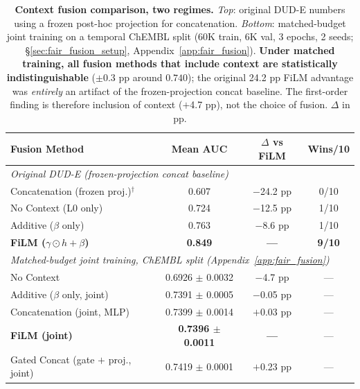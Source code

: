 \documentclass[sigconf]{acmart}
\begin{document}
\begin{table}[t]
\caption{\textbf{Context fusion comparison, two regimes.} \textit{Top}: original DUD-E numbers using a frozen post-hoc projection for concatenation. \textit{Bottom}: matched-budget joint training on a temporal ChEMBL split (60K train, 6K val, 3 epochs, 2 seeds; \S\ref{sec:fair_fusion_setup}, Appendix~\ref{app:fair_fusion}). \textbf{Under matched training, all fusion methods that include context are statistically indistinguishable} ($\pm 0.3$ pp around $0.740$); the original 24.2 pp FiLM advantage was \emph{entirely} an artifact of the frozen-projection concat baseline. The first-order finding is therefore inclusion of context ($+$4.7 pp), not the choice of fusion. $\Delta$ in pp.}
\label{tab:fusion}
\centering
\small
\begin{tabular}{@{}lccc@{}}
\toprule
\textbf{Fusion Method} & \textbf{Mean AUC} & \textbf{$\Delta$ vs FiLM} & \textbf{Wins/10} \\
\midrule
\multicolumn{4}{l}{\textit{Original DUD-E (frozen-projection concat baseline)}} \\
Concatenation (frozen proj.)$^\dagger$ & 0.607 & $-$24.2 pp & 0/10 \\
No Context (L0 only) & 0.724 & $-$12.5 pp & 1/10 \\
Additive ($\beta$ only) & 0.763 & $-$8.6 pp & 1/10 \\
\textbf{FiLM ($\gamma \odot h + \beta$)} & \textbf{0.849} & \textbf{---} & \textbf{9/10} \\
\midrule
\multicolumn{4}{l}{\textit{Matched-budget joint training, ChEMBL split (Appendix~\ref{app:fair_fusion})}} \\
No Context & 0.6926 $\pm$ 0.0032 & $-$4.7 pp & --- \\
Additive ($\beta$ only, joint) & 0.7391 $\pm$ 0.0005 & $-$0.05 pp & --- \\
Concatenation (joint, MLP) & 0.7399 $\pm$ 0.0014 & $+$0.03 pp & --- \\
\textbf{FiLM (joint)} & \textbf{0.7396 $\pm$ 0.0011} & \textbf{---} & --- \\
Gated Concat (gate $+$ proj., joint) & 0.7419 $\pm$ 0.0001 & $+$0.23 pp & --- \\
\bottomrule
\end{tabular}
\end{table}
\end{document}
